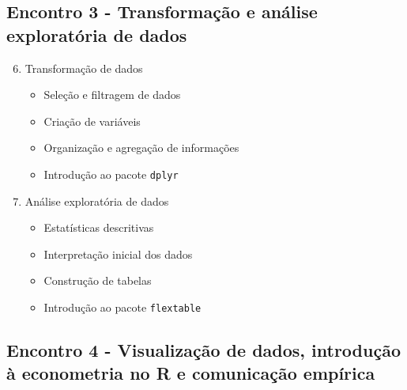 \documentclass[12pt,a4paper]{article}
\begin{document}
	\subsection*{Encontro 3 - Transformação e análise exploratória de dados}
	
	\begin{enumerate}[label=\arabic*.]
		\setcounter{enumi}{5}
		
		\item Transformação de dados
		\begin{itemize}
			\item Seleção e filtragem de dados
			\item Criação de variáveis
			\item Organização e agregação de informações
			\item Introdução ao pacote \texttt{dplyr}
		\end{itemize}
		
		\item Análise exploratória de dados
		\begin{itemize}
			\item Estatísticas descritivas
			\item Interpretação inicial dos dados
			\item Construção de tabelas
			\item Introdução ao pacote \texttt{flextable}
		\end{itemize}
		
	\end{enumerate}
	
	\subsection*{Encontro 4 - Visualização de dados, introdução à econometria no R e comunicação empírica}
	
\end{document}
